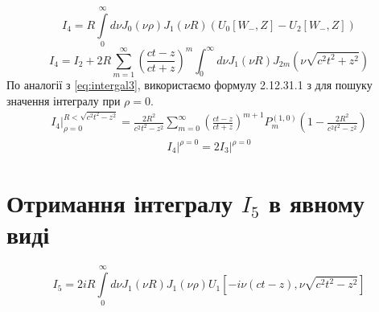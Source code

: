 \begin{equation}
I_4 = R \int \limits_{0}^{\infty} d \nu J_0(\nu \rho) J_1(\nu R) 
(U_0[ W_-, Z ] - U_2[ W_-, Z ])
\end{equation}
%
\begin{equation} \label{eq:i4_pol_int}
I_4 = I_2 + 2 R \sum_{m=1}^{\infty} \left( \frac{ct - z}{ct + z} \right)^m 
\int_{0}^{\infty} d \nu J_1(\nu R) J_{2m} (\nu \sqrt{c^2t^2 + z^2})
\end{equation}
%
По аналогії з \eqref{eq:intergal3}, використаємо формулу 2.12.31.1 з 
\cite[ст. 209]{imp:SpecFunc1983} для пошуку значення інтегралу при $ \rho = 0 $.
%
\begin{equation*} \begin{aligned}
\left. I_4 \right|_{\rho = 0}^{R < \sqrt{c^2 t^2 - z^2}} = 
\frac{2 R^2}{c^2 t^2 - z^2} \sum_{m=0}^{\infty} 
\left( \frac{ct - z}{ct + z} \right)^{m+1} P_{m}^{(1,0)} 
\left( 1 - \frac{2R^2}{c^2 t^2 - z^2} \right)
\end{aligned} \end{equation*}
%
\begin{equation} \begin{aligned} \label{eq:i4onaxis}
\left. I_4 \right|^{\rho = 0} = 2 \left. I_3 \right|^{\rho = 0}
\end{aligned} \end{equation}

\section{Отримання інтегралу $ I_5 $ в явному виді}

\begin{equation}
I_5 = 2 i R \int \limits_{0}^{\infty} d \nu 
J_1 \left( \nu R \right) J_1 \left( \nu \rho \right)
U_1 \left[ - i \nu \left( ct - z \right), \nu \sqrt{c^2t^2 - z^2} \right]
\end{equation}

